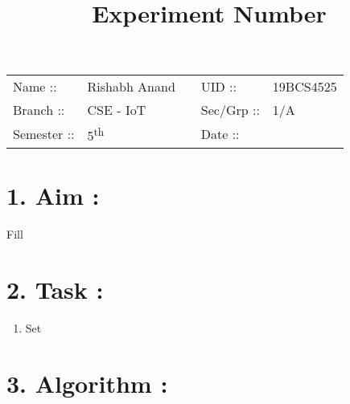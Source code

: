 \documentclass[14pt]{extarticle}
\title{%
    \textbf{
    \vspace{-3em} \\
    \Large Experiment Number\\
    \vspace{-4em}
    }
}
\author{}
\date{}
\begin{document}
\maketitle %

\section*{}
    \begin{tabular}{ llp{2cm}ll }
        Name :: & Rishabh Anand & & UID :: & 19BCS4525  \\
        Branch :: & CSE - IoT & & Sec/Grp :: & 1/A \\
        Semester :: & 5\textsuperscript{th} & & Date :: & \shortdate{\today} \\
    \end{tabular}

\vspace{1em}

\section*{\normalsize 1. Aim :}

Fill

\section*{\normalsize 2. Task :}

\begin{enumerate}
  \item Set
\end{enumerate}


\section*{\normalsize 3. Algorithm :}
\end{document}
